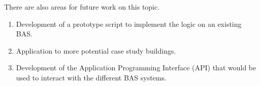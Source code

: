 There are also areas for future work on this topic.

\begin{enumerate}
    \item Development of a prototype script to implement the logic on an
        existing BAS. 
    \item Application to more potential case study buildings. 
    \item Development of the Application Programming Interface (API)
        that would be used to interact with the different BAS systems. 
\end{enumerate}

